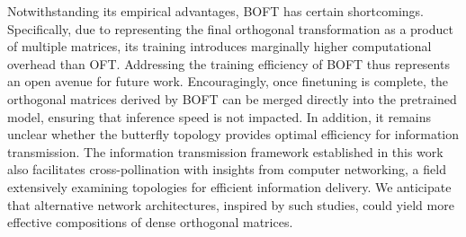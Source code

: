 Notwithstanding its empirical advantages, BOFT has certain shortcomings. Specifically, due to representing the final orthogonal transformation as a product of multiple matrices, its training introduces marginally higher computational overhead than OFT. Addressing the training efficiency of BOFT thus represents an open avenue for future work. Encouragingly, once finetuning is complete, the orthogonal matrices derived by BOFT can be merged directly into the pretrained model, ensuring that inference speed is not impacted. In addition, it remains unclear whether the butterfly topology provides optimal efficiency for information transmission. The information transmission framework established in this work also facilitates cross-pollination with insights from computer networking, a field extensively examining topologies for efficient information delivery. We anticipate that alternative network architectures, inspired by such studies, could yield more effective compositions of dense orthogonal matrices.

